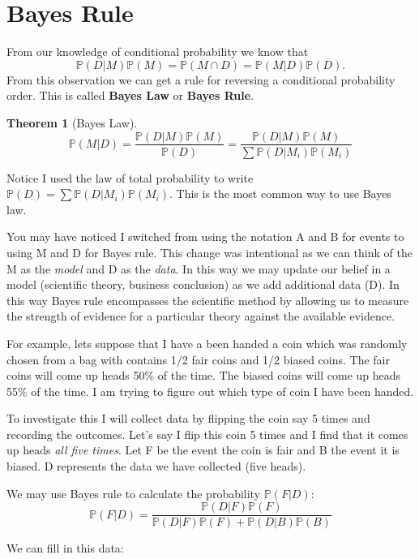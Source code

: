 \documentclass[
]{book}
\newcommand{\prob}[1]{{\mathbb{P}(#1)}}
\newtheorem{theorem}{Theorem}[chapter]
\theoremstyle{definition}
\theoremstyle{definition}
\theoremstyle{definition}
\theoremstyle{definition}
\theoremstyle{remark}
\begin{document}
\hypertarget{bayes-rule}{%
\section{Bayes Rule}\label{bayes-rule}}

From our knowledge of conditional probability we know that \[\prob{D|M}\prob{M}=\prob{M \cap D}=\prob{M|D}\prob{D}.\] From this observation we can get a rule for reversing a conditional probability order. This is called \textbf{Bayes Law} or \textbf{Bayes Rule}.

\begin{theorem}[Bayes Law]
\protect\hypertarget{thm:unnamed-chunk-249}{}\label{thm:unnamed-chunk-249}\[\prob{M|D}=\frac{\prob{D|M}\prob{M}}{\prob{D}}=\frac{\prob{D|M}\prob{M}}{\sum \prob{D|M_i}\prob{M_i}}\]
\end{theorem}

Notice I used the law of total probability to write \(\prob{D}=\sum \prob{D|M_i}\prob{M_i}\). This is the most common way to use Bayes law.

You may have noticed I switched from using the notation A and B for events to using M and D for Bayes rule. This change was intentional as we can think of the M as the \emph{model} and D as the \emph{data}. In this way we may update our belief in a model (scientific theory, business conclusion) as we add additional data (D). In this way Bayes rule encompasses the scientific method by allowing us to measure the strength of evidence for a particular theory against the available evidence.

For example, lets suppose that I have a been handed a coin which was randomly chosen from a bag with contains 1/2 fair coins and 1/2 biased coins. The fair coins will come up heads 50\% of the time. The biased coins will come up heads 55\% of the time. I am trying to figure out which type of coin I have been handed.

To investigate this I will collect data by flipping the coin say 5 times and recording the outcomes. Let's say I flip this coin 5 times and I find that it comes up heads \emph{all five times}. Let F be the event the coin is fair and B the event it is biased. D represents the data we have collected (five heads).

We may use Bayes rule to calculate the probability \(\prob{F|D}\):
\[
\prob{F|D}=\frac{\prob{D|F}\prob{F}}{\prob{D|F}\prob{F}+\prob{D|B}\prob{B}}
\]

We can fill in this data:
\end{document}

